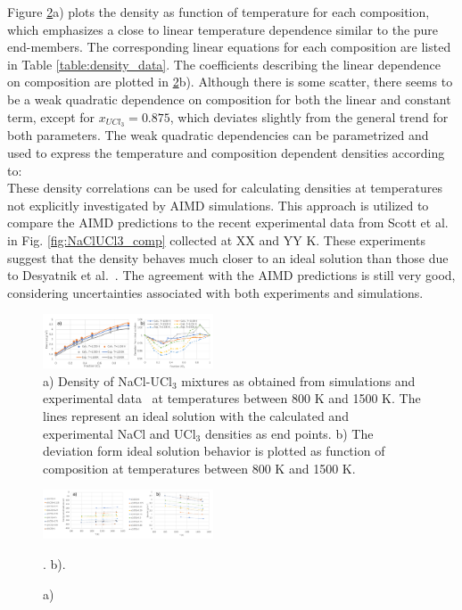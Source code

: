 \documentclass[preprint,3p,10pt,twocolumn,number,sort&compress]{elsarticle}
\begin{document}
Figure \ref{fig:NaClUCl3_t}a) plots the density as function of temperature for each composition, which emphasizes a close to linear temperature dependence similar to the pure end-members. The corresponding linear equations for each composition are listed in Table \ref{table:density_data}. 
The coefficients describing the linear dependence on composition are plotted in \ref{fig:NaClUCl3_t}b). Although there is some scatter, there seems to be a weak quadratic dependence on composition for both the linear and constant term, except for $x_{UCl_3}=0.875$, which deviates slightly from the general trend for both parameters. The weak quadratic dependencies can be parametrized and used to express the temperature and composition dependent densities according to:
\begin{equation}
\end{equation}
These density correlations can be used for calculating densities at temperatures not explicitly investigated by AIMD simulations. %
This approach is utilized to compare the AIMD predictions to the recent experimental data from Scott et al.~\cite{} in Fig. \ref{fig:NaClUCl3_comp} collected at XX and YY K. These experiments suggest that the density behaves much closer to an ideal solution than those due to Desyatnik et al.~\cite{}. The agreement with the AIMD predictions is still very good, considering uncertainties associated with both experiments and simulations.  

\begin{figure}[htb]
\centering
\includegraphics[width=0.45\textwidth]{./figures/FIG6.pdf}
\caption{a) Density of NaCl-UCl$_3$ mixtures as obtained from simulations and experimental data~\cite{} at temperatures between 800 K and 1500 K. The lines represent an ideal solution with the calculated and experimental NaCl and UCl$_3$ densities as end points. b) The deviation form ideal solution behavior is plotted as function of composition at temperatures between 800 K and 1500 K. %
} 
\label{fig:NaClUCl3}
\end{figure}

\begin{figure}[htb]
\centering
\includegraphics[width=0.45\textwidth]{./figures/FIG6c.pdf}
\caption{a)}. b). 
\label{fig:NaClUCl3_t}
\end{figure}
\end{document}
